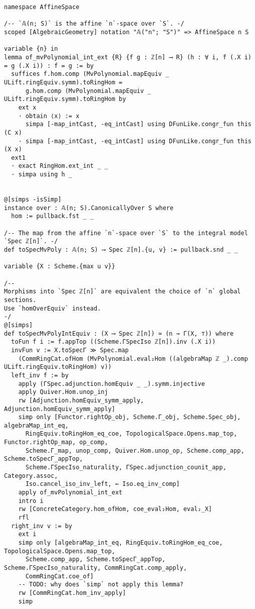 \documentclass{article}
\begin{document}
\begin{lstlisting}[language=Lean, caption={AffineSpace.lean}]
namespace AffineSpace

/-- `𝔸(n; S)` is the affine `n`-space over `S`. -/
scoped [AlgebraicGeometry] notation "𝔸("n"; "S")" => AffineSpace n S

variable {n} in
lemma of_mvPolynomial_int_ext {R} {f g : ℤ[n] ⟶ R} (h : ∀ i, f (.X i) = g (.X i)) : f = g := by
  suffices f.hom.comp (MvPolynomial.mapEquiv _ ULift.ringEquiv.symm).toRingHom =
      g.hom.comp (MvPolynomial.mapEquiv _ ULift.ringEquiv.symm).toRingHom by
    ext x
    · obtain ⟨x⟩ := x
      simpa [-map_intCast, -eq_intCast] using DFunLike.congr_fun this (C x)
    · simpa [-map_intCast, -eq_intCast] using DFunLike.congr_fun this (X x)
  ext1
  · exact RingHom.ext_int _ _
  · simpa using h _


@[simps -isSimp]
instance over : 𝔸(n; S).CanonicallyOver S where
  hom := pullback.fst _ _

/-- The map from the affine `n`-space over `S` to the integral model `Spec ℤ[n]`. -/
def toSpecMvPoly : 𝔸(n; S) ⟶ Spec ℤ[n].{u, v} := pullback.snd _ _

variable {X : Scheme.{max u v}}

/--
Morphisms into `Spec ℤ[n]` are equivalent the choice of `n` global sections.
Use `homOverEquiv` instead.
-/
@[simps]
def toSpecMvPolyIntEquiv : (X ⟶ Spec ℤ[n]) ≃ (n → Γ(X, ⊤)) where
  toFun f i := f.appTop ((Scheme.ΓSpecIso ℤ[n]).inv (.X i))
  invFun v := X.toSpecΓ ≫ Spec.map
    (CommRingCat.ofHom (MvPolynomial.eval₂Hom ((algebraMap ℤ _).comp ULift.ringEquiv.toRingHom) v))
  left_inv f := by
    apply (ΓSpec.adjunction.homEquiv _ _).symm.injective
    apply Quiver.Hom.unop_inj
    rw [Adjunction.homEquiv_symm_apply, Adjunction.homEquiv_symm_apply]
    simp only [Functor.rightOp_obj, Scheme.Γ_obj, Scheme.Spec_obj, algebraMap_int_eq,
      RingEquiv.toRingHom_eq_coe, TopologicalSpace.Opens.map_top, Functor.rightOp_map, op_comp,
      Scheme.Γ_map, unop_comp, Quiver.Hom.unop_op, Scheme.comp_app, Scheme.toSpecΓ_appTop,
      Scheme.ΓSpecIso_naturality, ΓSpec.adjunction_counit_app, Category.assoc,
      Iso.cancel_iso_inv_left, ← Iso.eq_inv_comp]
    apply of_mvPolynomial_int_ext
    intro i
    rw [ConcreteCategory.hom_ofHom, coe_eval₂Hom, eval₂_X]
    rfl
  right_inv v := by
    ext i
    simp only [algebraMap_int_eq, RingEquiv.toRingHom_eq_coe, TopologicalSpace.Opens.map_top,
      Scheme.comp_app, Scheme.toSpecΓ_appTop, Scheme.ΓSpecIso_naturality, CommRingCat.comp_apply,
      CommRingCat.coe_of]
    -- TODO: why does `simp` not apply this lemma?
    rw [CommRingCat.hom_inv_apply]
    simp


\end{lstlisting}
\end{document}
